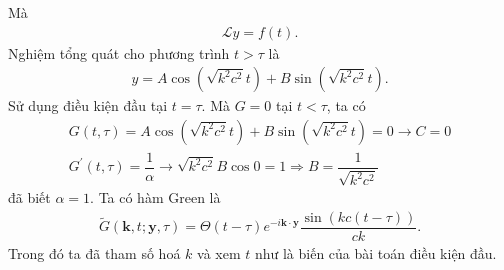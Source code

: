 \documentclass{report}
\newcommand{\f}[2]{\dfrac{#1}{#2}}
\begin{document}
	Mà
	\begin{gather}
		\mathcal{L} y = f(t).
	\end{gather}
	Nghiệm tổng quát cho phương trình $t > \tau$ là
	\begin{gather}
		y = A\cos(\sqrt{k^{2} c^{2}}t) + B\sin(\sqrt{k^{2} c^{2}}t).
	\end{gather}	
	Sử dụng điều kiện đầu tại $t = \tau$. Mà $G = 0$ tại $t < \tau$, ta có
	\begin{gather}
		G(t, \tau) = A\cos(\sqrt{k^{2} c^{2}}t) + B\sin(\sqrt{k^{2} c^{2}}t) = 0 \rightarrow C = 0\\
		G^{'}(t, \tau) = \f{1}{\alpha} \rightarrow \sqrt{k^{2} c^{2}} B \cos 0 = 1 \Rightarrow B = \f{1}{\sqrt{k^{2} c^{2}}}
	\end{gather}
	đã biết $\alpha = 1$. Ta có hàm Green là 
	\begin{gather}
		\tilde{G} (\mathbf{k}, t; \mathbf{y},\tau) = \Theta(t - \tau) e^{-i \mathbf{k} \cdot \mathbf{y}} \f{\sin ( k c (t - \tau) )}{c k}. 
	\end{gather}
	Trong đó ta đã tham số hoá $k$ và xem $t$ như là biến của bài toán điều kiện đầu.
	
\end{document}
